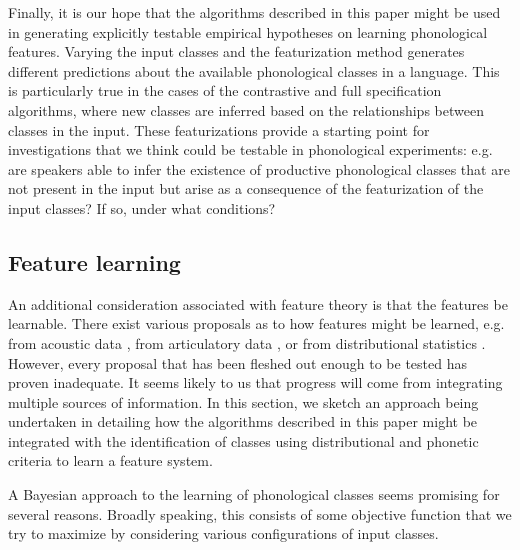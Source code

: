 \documentclass[11pt, oneside]{article}   	%
\begin{document}
Finally, it is our hope that the algorithms described in this paper might be used in generating explicitly testable empirical hypotheses on learning phonological features. Varying the input classes and the featurization method generates different predictions about the available phonological classes in a language. This is particularly true in the cases of the contrastive and full specification algorithms, where new classes are inferred based on the relationships between classes in the input. These featurizations provide a starting point for investigations that we think could be testable in phonological experiments: e.g. are speakers able to infer the existence of productive phonological classes that are not present in the input but arise as a consequence of the featurization of the input classes? If so, under what conditions? 

\subsection{Feature learning}

An additional consideration associated with feature theory is that the features be learnable. There exist various proposals as to how features might be learned, e.g. from acoustic data \cite{TODO}, from articulatory data \cite{TODO}, or from distributional statistics \cite{TODO}. However, every proposal that has been fleshed out enough to be tested has proven inadequate. It seems likely to us that progress will come from integrating multiple sources of information. In this section, we sketch an approach being undertaken in  detailing how the algorithms described in this paper might be integrated with the identification of classes using distributional and phonetic criteria to learn a feature system.

A Bayesian approach to the learning of phonological classes seems promising for several reasons. Broadly speaking, this consists of some objective function that we try to maximize by considering various configurations of input classes. 
\end{document}
